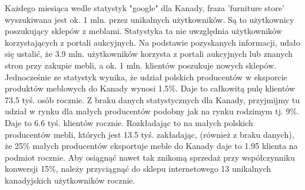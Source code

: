 		\begin{table}[H]
		\centering
		\caption{Dane statystyczne dotyczące zamieszkania w Kanadzie}
		\label{avg_home_ca}
		\end{table}

		\par Każdego miesiąca wedle statystyk "google" dla Kanady, fraza 'furniture store' wyszukiwana jest ok. 1 mln. przez unikalnych użytkowników. Są to użytkownicy poszukujący sklepów z meblami. Statystyka ta nie uwzględnia użytkowników korzystających z portali aukcyjnych. Na podstawie pozyskanych informacji, udało się ustalić, że 3.9 mln. użytkowników korzysta z portali aukcyjnych lub znanych stron przy zakupie mebli, a ok. 1 mln. klientów poszukuje nowych sklepów. Jednocześnie ze statystyk wynika, że udział polskich producentów w eksporcie produktów meblowych do Kanady wynosi 1.5\%. Daje to całkowitą pulę klientów 73.5 tyś. osób rocznie. Z braku danych statystycznych dla Kanady, przyjmijmy tu udział w rynku dla małych producentów podobny jak na rynku rodzimym tj. 9\%. Daje to 6.6 tyś. klientów rocznie. Rozkładając to na małych polskich producentów mebli, których jest 13.5 tyś. zakładając, (również z braku danych), że 25\% małych producentów eksportuje meble do Kanady daje to 1.95 klienta na podmiot rocznie. Aby osiągnąć nawet tak znikomą sprzedaż przy współczynniku konwersji 15\%, należy przyciągnąć do sklepu internetowego 13 unikalnych kanadyjskich użytkowników rocznie.
		
